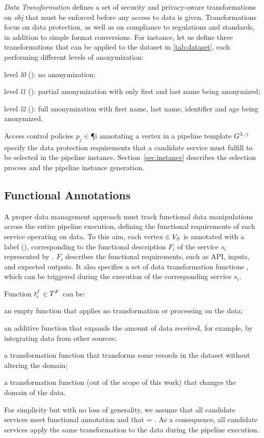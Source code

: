       \textit{Data Transformation \TP} defines a set of security and privacy-aware transformations on \textit{obj} that must be enforced before any access to data is given. Transformations focus on data protection, as well as on compliance to regulations and standards, in addition to simple format conversions. For instance, let us define three transformations that can be applied to the dataset in \cref{tab:dataset}, each performing different levels of anonymization:
      \begin{enumerate*}[label=\roman*)]
        \item level \emph{l0} (): no anonymization;
        \item level \emph{l1} (): partial anonymization with only first and last name being anonymized;
        \item level \emph{l2} (): full anonymization with first name, last name, identifier and age being anonymized.
      \end{enumerate*}

      Access control policies $p_j$$\in$\P{i} annotating a vertex  in a pipeline template $G^{\lambda\,,\gamma\,}$ specify the data protection requirements that a candidate service must fulfill to be selected in the pipeline instance. Section~\ref{sec:instance} describes the selection process and the pipeline instance generation.

    \subsection{Functional Annotations}\label{sec:funcannotation}
    A proper data management approach must track functional data manipulations across the entire pipeline execution, defining the functional requirements of each service operating on data.
    To this aim, each vertex $\in V_S$ is annotated with a label \myGamma(), corresponding to the functional description $F_i$ of the service $s_i$ represented by .
  $F_i$ describes the functional requirements, such as API, inputs, and expected outputs.
    It also specifies a set \TF{} of data transformation functions , which can be triggered during the execution of the corresponding service $s_i$.

    Function $t^f_{i}$$\in$$T^F_{}$ can be:
\begin{enumerate*}[label=\textit{\roman*})]
  \item an empty function \tf{\epsilon} that applies no transformation or processing on the data;
  \item an additive function  that expands the amount of data received, for example, by integrating data from other sources;
  \item a transformation function  that transforms some records in the dataset without altering the domain;
  \item a transformation function  (out of the scope of this work) that changes the domain of the data.
\end{enumerate*}

For simplicity but with no loss of generality, we assume that all candidate services meet functional annotation \F{} and that \TF{}= \tf{}. As a consequence, all candidate services apply the same transformation to the data during the pipeline execution.
